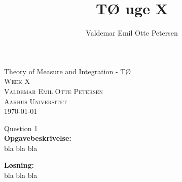 \documentclass{article}
\author{Valdemar Emil Otte Petersen}
\title{TØ uge X}
\begin{document}
\begingroup

\centering 
{\LARGE Theory of Measure and Integration - TØ}\\ %
\vspace*{1\baselineskip}
\scshape
Week X\\ %
Valdemar Emil Otte Petersen\\ %
{\small Aarhus Universitet}\\ 
{\small \today}

\endgroup


{\LARGE Question 1}\\
\textbf{Opgavebeskrivelse:}\\
bla bla bla

\vspace{15px}
\textbf{Løsning:}\\
bla bla bla

\vspace{35px}
\end{document}
